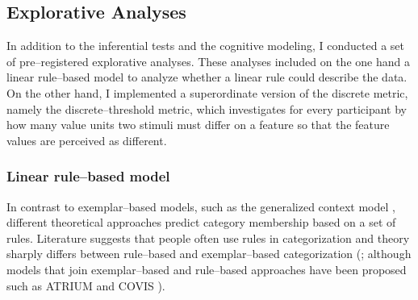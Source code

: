 \documentclass[a4paper,man,natbib]{apa6}
\begin{document}
\subsection{Explorative Analyses}
In addition to the inferential tests and the cognitive modeling, I conducted a set of pre--registered explorative analyses. These analyses included on the one hand a linear rule--based model to analyze whether a linear rule could describe the data. On the other hand, I implemented a superordinate version of the discrete metric, namely the discrete--threshold metric, which investigates for every participant by how many value units two stimuli must differ on a feature so that the feature values are perceived as different.

\subsubsection{Linear rule--based model}
In contrast to exemplar--based models, such as the generalized context model \citep{nosofsky1986attention}, different theoretical approaches predict category membership based on a set of rules. Literature suggests that people often use rules in categorization \citep{restle1962selection, tom1968attention, rouder2006comparing} and theory sharply differs between rule--based and exemplar--based categorization (\citealp{rouder2006comparing}; although models that join exemplar--based and rule--based approaches have been proposed such as ATRIUM \citealp{erickson1998rules} and COVIS \citealp{ashby2011covis}). 
\end{document}
